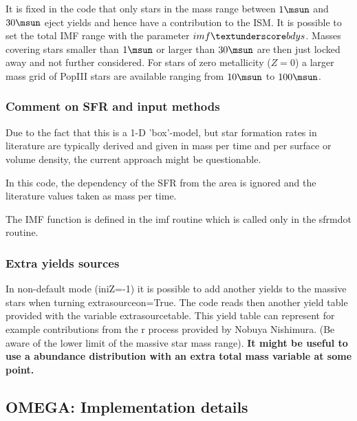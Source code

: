 It is fixed in the code that only stars in the mass range between
$1\msun$ and $30\msun$ eject yields and hence have a contribution 
to the ISM.
It is possible to set the total IMF range with the parameter
$imf\textunderscore bdys$. Masses covering stars smaller than
$1\msun$ or larger than $30\msun$ are then just locked away
and not further considered.
For stars of zero metallicity ($Z=0$) a larger mass grid
of PopIII stars are available ranging from $10\msun$ to $100\msun$.


\subsubsection{Comment on SFR and input methods}

Due to the fact that this is a 1-D 'box'-model,
but star formation rates in literature are 
typically derived and given in mass per time
and per surface or volume density, the current
approach might be questionable.

In this code, the dependency of the SFR from
the area is ignored and the literature values
taken as mass per time. 

The IMF function is defined in the imf routine
which is called only in the sfrmdot routine.

\subsubsection{Extra yields sources}

In non-default mode (iniZ=-1) it is possible to
add another yields to the massive stars when
turning extra\textunderscore source\textunderscore on=True.
The code reads then another yield table provided
with the variable extra\textunderscore source\textunderscore table.
This yield table can represent for example contributions from the
r process provided by Nobuya Nishimura. (Be aware of the lower limit
of the massive star mass range).
\textbf{It might be useful to use a abundance distribution with an
extra total mass variable at some point.}

\subsection{OMEGA: Implementation details}
\label{sect_omega}
